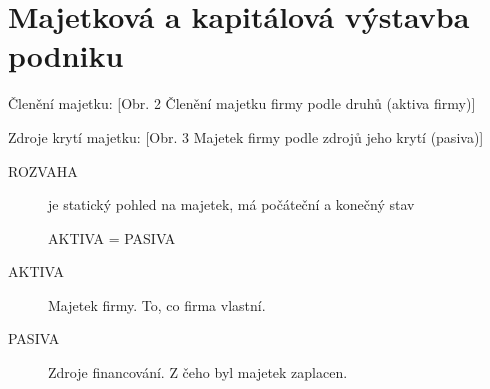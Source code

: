 \chapter{Majetková a kapitálová výstavba podniku}

Členění majetku:
[Obr. 2 Členění majetku firmy podle druhů (aktiva firmy)]

Zdroje krytí majetku:
[Obr. 3 Majetek firmy podle zdrojů jeho krytí (pasiva)]
\begin{description}
    \item[ROZVAHA] je statický pohled na majetek, má počáteční a konečný stav \par
        \begin{center}
            {\Large AKTIVA = PASIVA}
        \end{center}
    \item[AKTIVA] Majetek firmy. To, co firma vlastní.
    \item[PASIVA] Zdroje financování. Z čeho byl majetek zaplacen.
\end{description}

